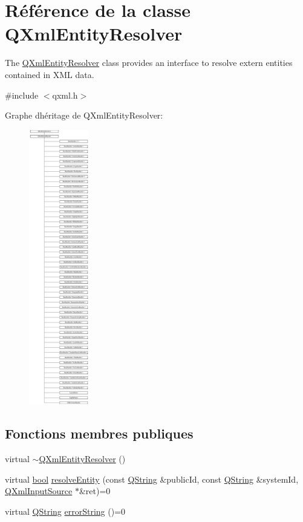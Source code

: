 \hypertarget{class_q_xml_entity_resolver}{}\section{Référence de la classe Q\+Xml\+Entity\+Resolver}
\label{class_q_xml_entity_resolver}


The \hyperlink{class_q_xml_entity_resolver}{Q\+Xml\+Entity\+Resolver} class provides an interface to resolve extern entities contained in X\+M\+L data.  




{\ttfamily \#include $<$qxml.\+h$>$}

Graphe d\textquotesingle{}héritage de Q\+Xml\+Entity\+Resolver\+:\begin{figure}[H]
\begin{center}
\leavevmode
\includegraphics[height=12.000000cm]{class_q_xml_entity_resolver}
\end{center}
\end{figure}
\subsection*{Fonctions membres publiques}
\begin{DoxyCompactItemize}
\item 
virtual \hyperlink{class_q_xml_entity_resolver_a3a3c77b09f121dbf6bc43124a9ded5f4}{$\sim$\+Q\+Xml\+Entity\+Resolver} ()
\item 
virtual \hyperlink{qglobal_8h_a1062901a7428fdd9c7f180f5e01ea056}{bool} \hyperlink{class_q_xml_entity_resolver_a4b0b6141c016eb3f7e37361f4ce13966}{resolve\+Entity} (const \hyperlink{class_q_string}{Q\+String} \&public\+Id, const \hyperlink{class_q_string}{Q\+String} \&system\+Id, \hyperlink{class_q_xml_input_source}{Q\+Xml\+Input\+Source} $\ast$\&ret)=0
\item 
virtual \hyperlink{class_q_string}{Q\+String} \hyperlink{class_q_xml_entity_resolver_a3f190a7cd80a8faa3df903f963709370}{error\+String} ()=0
\end{DoxyCompactItemize}


